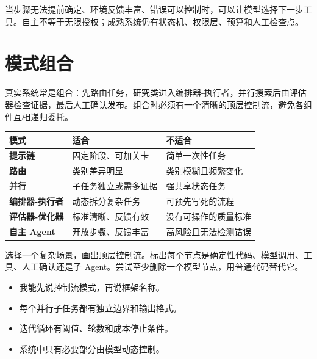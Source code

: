 当步骤无法提前确定、环境反馈丰富、错误可以控制时，可以让模型选择下一步工具。自主不等于无限授权；成熟系统仍有状态机、权限层、预算和人工检查点。

\section{模式组合}

真实系统常是组合：先路由任务，研究类进入编排器-执行者，并行搜索后由评估器检查证据，最后人工确认发布。组合时必须有一个清晰的顶层控制流，避免各组件互相递归委托。

\begin{table}[htbp]
\centering
\small
\begin{tabularx}{\textwidth}{>{\bfseries}p{} X X}
\toprule
模式 & 适合 & 不适合 \\
\midrule
提示链 & 固定阶段、可加关卡 & 简单一次性任务 \\
路由 & 类别差异明显 & 类别模糊且频繁变化 \\
并行 & 子任务独立或需多证据 & 强共享状态任务 \\
编排器-执行者 & 动态拆分复杂任务 & 可预先写死的流程 \\
评估器-优化器 & 标准清晰、反馈有效 & 没有可操作的质量标准 \\
自主 Agent & 开放步骤、反馈丰富 & 高风险且无法检测错误 \\
\bottomrule
\end{tabularx}
\end{table}

\begin{practice}
选择一个复杂场景，画出顶层控制流。标出每个节点是确定性代码、模型调用、工具、人工确认还是子 Agent。尝试至少删除一个模型节点，用普通代码替代它。
\end{practice}

\begin{checkpoint}
\begin{itemize}
  \item \checkbox 我能先说控制流模式，再说框架名称。
  \item \checkbox 每个并行子任务都有独立边界和输出格式。
  \item \checkbox 迭代循环有阈值、轮数和成本停止条件。
  \item \checkbox 系统中只有必要部分由模型动态控制。
\end{itemize}
\end{checkpoint}

